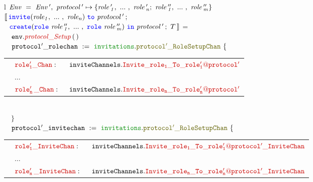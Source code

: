 \documentclass[12pt,twoside]{report}
\begin{document}
\begin{figure}[!h]
    \begin{center}
        \begin{tabular}{l}
            $\mathit{Env\ =\ Env\,',\ protocol\,' \mapsto \{\roles{role\,'}{n};\ \roles{role\,''}{m}\}}$\\[10pt]

            $\llbracket\,\invite(\roles{role}{n})\ \scrto\ \mathit{protocol\,'}\,;$\\[1.5pt] 
            $\ \,\,\create(\rolessig{role\,''}{m})\ \scrin\ \mathit{protocol\,'}\,;\ T\,\rrbracket$ =\\[6pt]
            
            {\footnotesize
            $\quad \methodcall{\envparam}{protocol\_Setup}\,\emptyparams$}\\[3pt]

            {\footnotesize
            $\quad \varname{protocol'\_rolechan}\ :=\ \pkgstructaccess{invitations}{protocol'\_RoleSetupChan}\ \{$}\\[3pt]
            {\footnotesize
            \quad \begin{tabular}{lll}
                \indent & $\structfield{role'_1\_Chan}:$\ &$\structaccess{\invitechannels}{Invite\_role_1\_To\_\localprotocol{role'_1}{protocol'}}$\\
                \indent & $\dots$ & \\
                \indent & $\structfield{role'_n\,\_Chan}:$\ &$\structaccess{\invitechannels}{Invite\_role_n\_To\_\localprotocol{role'_n}{protocol'}}$
            \end{tabular}}\\

            {\footnotesize
            $\quad \}$}\\[3pt]

            {\footnotesize
            $\quad \varname{protocol'\_invitechan}\ :=\ \pkgstructaccess{invitations}{protocol'\_RoleSetupChan}\ \{$}\\[3pt]
           
            {\footnotesize
            \quad \begin{tabular}{lll}
                \indent & $\structfield{role'_1\_InviteChan}:$\ &$\structaccess{\invitechannels}{Invite\_role_1\_To\_\localprotocol{role'_1}{protocol'}\_InviteChan}$\\
                \indent & $\dots$ & \\
                \indent & $\structfield{role'_n\,\_InviteChan}:$\ &$\structaccess{\invitechannels}{Invite\_role_n\_To\_\localprotocol{role'_n}{protocol'}\_InviteChan}$
            \end{tabular}}\\


\end{tabular}
\end{center}
\end{figure}
\end{document}
